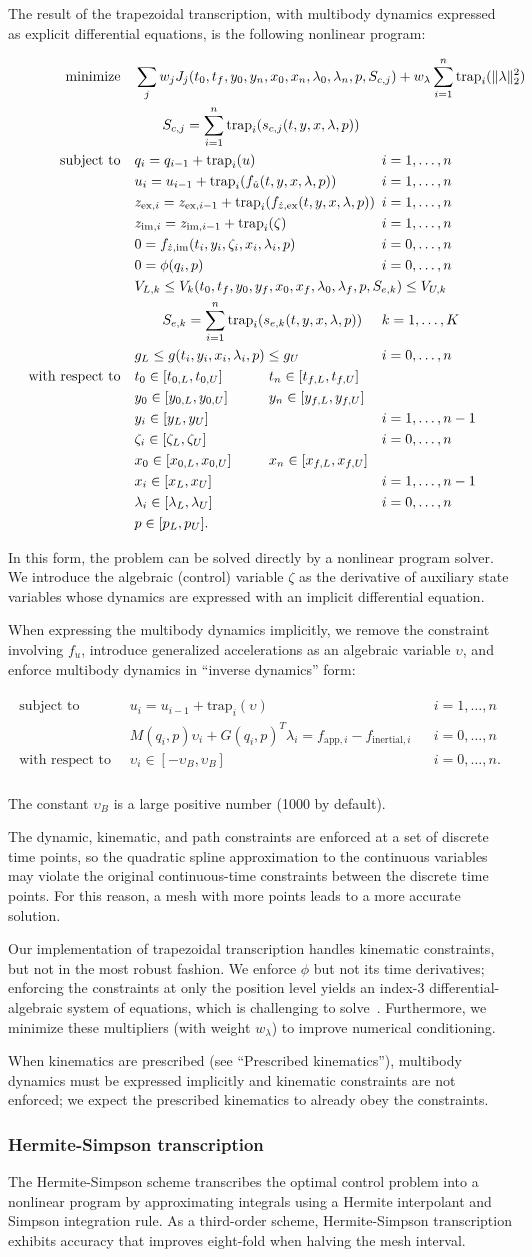 \documentclass[10pt,letterpaper]{article}
\newcommand{\trapnlp}{
\begin{align}
    \begin{aligned}
        \mbox{minimize} \quad
         & \sum_j w_j J_{j}(t_0, t_f, \mathrlap{y_0, y_n, x_{0}, x_{n}, \lambda_0, \lambda_n, p, S_{c,j})
          + w_{\lambda} \sum_{i=1}^{n} \textrm{trap}_i(\|\lambda\|_2^2)}  \\
         & \quad\quad \mathrlap{S_{c,j} = \sum_{i=1}^{n} \textrm{trap}_i(s_{c,j}(t, y, x, \lambda, p))} \\
        \mbox{subject to} \quad
         & \mathrlap{q_i = q_{i-1} + \textrm{trap}_i(u)} &&&& i = 1, \ldots, n \\
         & \mathrlap{u_i = u_{i-1} + \textrm{trap}_i(f_{\dot{u}}(t, y, x, \lambda, p))}  &&&& i = 1, \ldots, n \\
         & \mathrlap{z_{\textrm{ex},i} = z_{\textrm{ex},i-1} + \textrm{trap}_i(f_{\dot{z},\textrm{ex}}(t, y, x, \lambda, p))} &&&& i = 1, \ldots, n \\
         & \mathrlap{z_{\textrm{im},i} = z_{\textrm{im},i-1} + \textrm{trap}_i(\zeta)} &&&& i = 1, \ldots, n \\
         & \mathrlap{0 = f_{\dot{z},\textrm{im}}(t_i, y_i, \zeta_i, x_i, \lambda_i, p)} &&&& i = 0, \ldots, n \\
         & 0 = \phi(q_i, p)  &&&& i = 0, \ldots, n\\
         & V_{L,k} \leq V_k(t_0, t_f, y_0, \mathrlap{y_f, x_{0}, x_{f}, \lambda_0, \lambda_f, p, S_{e,k}) \leq V_{U,k}} \\
         & \quad\quad \mathrlap{S_{e,k} = \sum_{i=1}^{n} \textrm{trap}_i(s_{e,k}(t, y, x, \lambda, p))} &&&& k = 1, \ldots, K \\
         & \mathrlap{g_{L} \leq g(t_i, y_i, x_{i}, \lambda_i, p) \leq g_{U}}  &&&& i = 0, \ldots, n\\
         \mbox{with respect to} \quad
         & t_0 \in [t_{0,L}, t_{0,U}] && t_n \in [t_{f,L}, t_{f,U}] \\
         & y_0 \in [y_{0,L}, y_{0,U}] && y_n \in [y_{f,L}, y_{f,U}] \\
         & y_i \in [y_{L}, y_{U}] &&&& i = 1, \ldots, n - 1\\
         & \zeta_i \in [\zeta_{L}, \zeta_{U}] &&&& i = 0, \ldots, n \\
         & x_0 \in [x_{0,L}, x_{0,U}] && x_n \in [x_{f,L}, x_{f,U}] \\
         & x_i \in [x_{L}, x_{U}] &&&& i = 1, \ldots, n - 1\\
         & \lambda_i \in [\lambda_L, \lambda_U] &&&& i = 0, \ldots, n \\
         & p \in [p_{L}, p_{U}].
    \end{aligned}
\end{align}
}
\newcommand{\trapimplicit}{
\begin{align}
    \begin{aligned}
    \mbox{subject to} \quad
         & u_i = u_{i-1} + \textrm{trap}_i(\upsilon)  && i = 1, \ldots, n \\
         & M(q_i, p)\upsilon_i + G(q_i, p)^T \lambda_i =
          f_{\textrm{app},i} - f_{\textrm{inertial},i} && i = 0, \ldots, n \\
    \mbox{with respect to} \quad
         & \upsilon_i \in [-\upsilon_{B}, \upsilon_{B}] && i = 0, \ldots, n.\\
    \end{aligned}
\end{align}
}
\begin{document}
The result of the trapezoidal transcription, with multibody dynamics expressed as explicit differential equations, is the following nonlinear program:

\trapnlp

In this form, the problem can be solved directly by a nonlinear program solver. We introduce the algebraic (control) variable $\zeta$ as the derivative of auxiliary state variables whose dynamics are expressed with an implicit differential equation.

When expressing the multibody dynamics implicitly, we remove the constraint involving $f_{\dot{u}}$, introduce generalized accelerations as an algebraic variable $\upsilon$, and enforce multibody dynamics in “inverse dynamics” form:

\trapimplicit

The constant $\upsilon_B$ is a large positive number (1000 by default).

The dynamic, kinematic, and path constraints are enforced at a set of discrete time points, so the quadratic spline approximation to the continuous variables may violate the original continuous-time constraints between the discrete time points. For this reason, a mesh with more points leads to a more accurate solution.

Our implementation of trapezoidal transcription handles kinematic constraints, but not in the most robust fashion. We enforce $\phi$ but not its time derivatives; enforcing the constraints at only the position level yields an index-3 differential-algebraic system of equations, which is challenging to solve~\cite{Hairer:1996,Campbell:2016,Betts:2010}. Furthermore, we minimize these multipliers (with weight $w_\lambda$) to improve numerical conditioning.

When kinematics are prescribed (see “Prescribed kinematics”), multibody dynamics must be expressed implicitly and kinematic constraints are not enforced; we expect the prescribed kinematics to already obey the constraints.

\subsubsection*{Hermite-Simpson transcription}

The Hermite-Simpson scheme transcribes the optimal control problem into a nonlinear program by approximating integrals using a Hermite interpolant and Simpson integration rule. As a third-order scheme, Hermite-Simpson transcription exhibits accuracy that improves eight-fold when halving the mesh interval.
\end{document}
